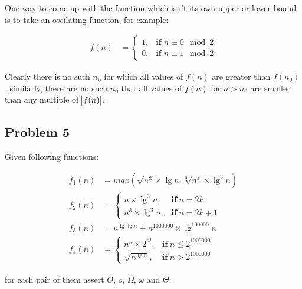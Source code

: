 \documentclass[11pt]{article}
\begin{document}
One way to come up with the function which isn't its own upper or lower bound
is to take an oscilating function, for example:

\begin{align*}
  f(n) &= \begin{cases}
    1, &\textbf{if}\; n \equiv 0 \mod 2 \\
    0, &\textbf{if}\; n \equiv 1 \mod 2
  \end{cases}
\end{align*}

Clearly there is no such \(n_0\) for which all values of \(f(n)\) are greater
than \(f(n_0)\), similarly, there are no such \(n_0\) that all values of \(f(n)\)
for \(n > n_0\) are smaller than any multiple of \(\abs{f(n)}\).

\subsection{Problem 5}
\label{sec:orgheadline11}
Given following functions:

\begin{align*}
  f_1(n) &= max\left(\sqrt{n^3} \times \lg n, \sqrt[3]{n^4} \times \lg^5 n\right) \\
  f_2(n) &= \begin{cases}
    n \times \lg^3 n, &\textbf{if}\; n = 2k \\
    n^3 \times \lg^3 n, &\textbf{if}\; n = 2k + 1
  \end{cases} \\
  f_3(n) &= n^{\lg\lg n} + n^{1000000} \times \lg^{100000} n \\
  f_4(n) &= \begin{cases}
    n^n \times 2^{n!}, &\textbf{if}\; n \leq 2^{1000000} \\
    \sqrt{n^{\lg n}}, &\textbf{if}\; n > 2^{1000000}
  \end{cases}
\end{align*}

for each pair of them assert \(O\), \(o\), \(\Omega\), \(\omega\) and \(\Theta\).
\end{document}
